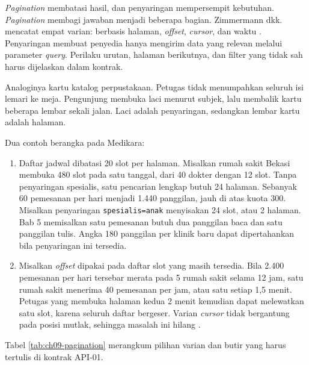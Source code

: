 \textit{Pagination} membatasi hasil, dan penyaringan mempersempit kebutuhan. \textit{Pagination} membagi jawaban menjadi beberapa bagian. Zimmermann
dkk. mencatat empat varian: berbasis halaman, \textit{offset}, \textit{cursor}, dan waktu \cite{zimmermann2022patterns}. Penyaringan membuat penyedia hanya mengirim data
yang relevan melalui parameter \textit{query}. Perilaku urutan, halaman berikutnya, dan filter yang tidak sah harus dijelaskan dalam kontrak.

Analoginya kartu katalog perpustakaan. Petugas tidak menumpahkan seluruh isi lemari ke meja. Pengunjung membuka laci menurut subjek, lalu membalik kartu
beberapa lembar sekali jalan. Laci adalah penyaringan, sedangkan lembar kartu adalah halaman.

Dua contoh berangka pada Medikara:
\begin{enumerate}
  \item Daftar jadwal dibatasi 20 slot per halaman. Misalkan rumah sakit Bekasi membuka 480 slot pada satu tanggal, dari 40 dokter dengan 12 slot. Tanpa
        penyaringan spesialis, satu pencarian lengkap butuh 24 halaman. Sebanyak 60 pemesanan per hari menjadi 1.440 panggilan, jauh di atas kuota 300.
        Misalkan penyaringan \texttt{spesialis=anak} menyisakan 24 slot, atau 2 halaman. Bab 5 memisalkan satu pemesanan butuh dua panggilan baca dan satu
        panggilan tulis. Angka 180 panggilan per klinik baru dapat dipertahankan bila penyaringan ini tersedia.
  \item Misalkan \textit{offset} dipakai pada daftar slot yang masih tersedia. Bila 2.400 pemesanan per hari tersebar merata pada 5 rumah sakit selama 12 jam,
        satu rumah sakit menerima 40 pemesanan per jam, atau satu setiap 1,5 menit. Petugas yang membuka halaman kedua 2 menit kemudian dapat melewatkan satu
        slot, karena seluruh daftar bergeser. Varian \textit{cursor} tidak bergantung pada posisi mutlak, sehingga masalah ini hilang
        \cite{zimmermann2022patterns}.
\end{enumerate}

Tabel \ref{tab:ch09-pagination} merangkum pilihan varian dan butir yang harus tertulis di kontrak API-01.

